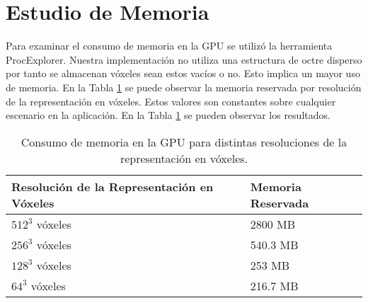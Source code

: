 \section{Estudio de Memoria}
Para examinar el consumo de memoria en la \ac{GPU} se utilizó la herramienta ProcExplorer. Nuestra implementación no utiliza una estructura de octre disperso por tanto se almacenan vóxeles sean estos vacíos o no. Esto implica un mayor uso de memoria. En la Tabla \ref{tab:memory} se puede observar la memoria reservada por resolución de la representación en vóxeles. Estos valores son constantes sobre cualquier escenario en la aplicación. En la Tabla \ref{tab:memory} se pueden observar los resultados.
\begin{table}[H]
	\centering
	\begin{tabular}{ll}
	Resolución de la Representación en Vóxeles & Memoria Reservada             \\ \hline
	\multicolumn{1}{|l|}{$512^3$ vóxeles}                  & \multicolumn{1}{l|}{2800 MB}  \\
	\multicolumn{1}{|l|}{$256^3$ vóxeles}                  & \multicolumn{1}{l|}{540.3 MB} \\
	\multicolumn{1}{|l|}{$128^3$ vóxeles}                  & \multicolumn{1}{l|}{253 MB}   \\
	\multicolumn{1}{|l|}{$64^3$ vóxeles}                   & \multicolumn{1}{l|}{216.7 MB} \\ \hline
	\end{tabular}
	\caption{Consumo de memoria en la \ac{GPU} para distintas resoluciones de la representación en vóxeles.}
	\label{tab:memory}
\end{table}

